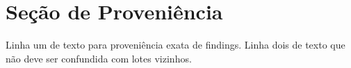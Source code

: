 \documentclass{article}
\begin{document}
\section{Seção de Proveniência}
Linha um de texto para proveniência exata de findings.
Linha dois de texto que não deve ser confundida com lotes vizinhos.

\end{document}
